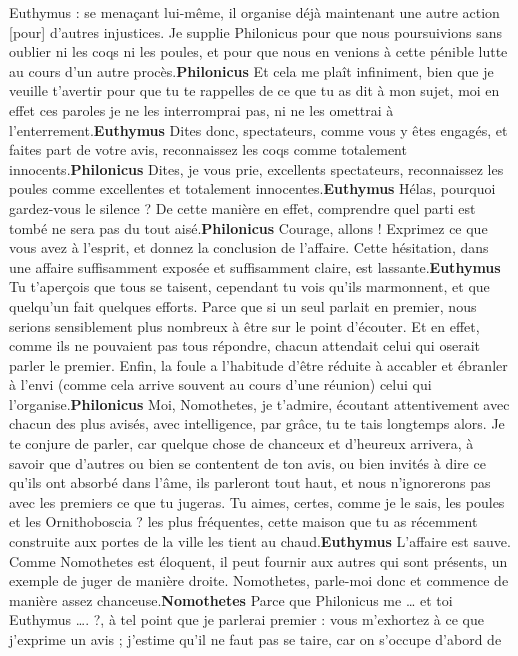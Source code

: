 \documentclass[12pt]{book}
\begin{document}
\begin{pages}
\begin{Rightside}
Euthymus : se menaçant lui-même, il organise déjà maintenant une autre action [pour] d'autres injustices. Je supplie Philonicus pour que nous poursuivions sans oublier ni les coqs ni les poules, et pour que nous en venions à cette pénible lutte au cours d'un autre procès.\pend\pstart\textbf{Philonicus }\hspace{1cm} Et cela me plaît infiniment, bien que je veuille t'avertir pour que tu te rappelles de ce que tu as dit à mon sujet, moi en effet ces paroles je ne les interromprai pas, ni ne les omettrai à l'enterrement.\pend\pstart\textbf{Euthymus }\hspace{1cm} Dites donc, spectateurs, comme vous y êtes engagés, et faites part de votre avis, reconnaissez les coqs comme totalement innocents.\pend\pstart\textbf{Philonicus }\hspace{1cm} Dites, je vous prie, excellents spectateurs, reconnaissez les poules comme excellentes et totalement innocentes.\pend\pstart\textbf{Euthymus }\hspace{1cm} Hélas, pourquoi gardez-vous le silence ? De cette manière en effet, comprendre quel parti est tombé ne sera pas du tout aisé.\pend\pstart\textbf{Philonicus }\hspace{1cm} Courage, allons ! Exprimez ce que vous avez à l'esprit, et donnez la conclusion de l'affaire. Cette hésitation, dans une affaire suffisamment exposée et suffisamment claire, est lassante.\pend\pstart\textbf{Euthymus }\hspace{1cm} Tu t'aperçois que tous se taisent, cependant tu vois qu'ils marmonnent, et que quelqu'un fait quelques efforts. Parce que si un seul parlait en premier, nous serions sensiblement plus nombreux à être sur le point d'écouter. Et en effet, comme ils ne pouvaient pas tous répondre, chacun attendait celui qui oserait parler le premier. Enfin, la foule a l'habitude d'être réduite à accabler et ébranler à l'envi (comme cela arrive souvent au cours d'une réunion) celui qui l'organise.\pend\pstart\textbf{Philonicus }\hspace{1cm} Moi, Nomothetes, je t’admire, écoutant attentivement avec chacun des plus avisés, avec intelligence, par grâce, tu te tais longtemps alors. Je te conjure de parler, car quelque chose de chanceux et d’heureux arrivera, à savoir que d’autres ou bien se contentent de ton avis, ou bien invités à dire ce qu’ils ont absorbé dans l’âme, ils parleront tout haut, et nous n’ignorerons pas avec les premiers ce que tu jugeras. Tu aimes, certes, comme je le sais, les poules et les Ornithoboscia ? les plus fréquentes, cette maison que tu as récemment construite aux portes de la ville les tient au chaud.\pend\pstart\textbf{Euthymus }\hspace{1cm} L’affaire est sauve. Comme Nomothetes est éloquent, il peut fournir aux autres qui sont présents, un exemple de juger de manière droite. Nomothetes, parle-moi donc et commence de manière assez chanceuse.\pend\pstart\textbf{Nomothetes }\hspace{1cm} Parce que Philonicus me … et toi Euthymus …. ?, à tel point que je parlerai premier : vous m’exhortez à ce que j’exprime un avis ; j’estime qu’il ne faut pas se taire, car on s’occupe d’abord de 
\end{Rightside}
\end{pages}
\end{document}
